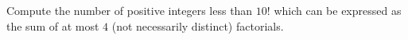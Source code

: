 Compute the number of positive integers less than $10!$ which can be expressed as the sum of at most $4$ (not necessarily distinct) factorials.
